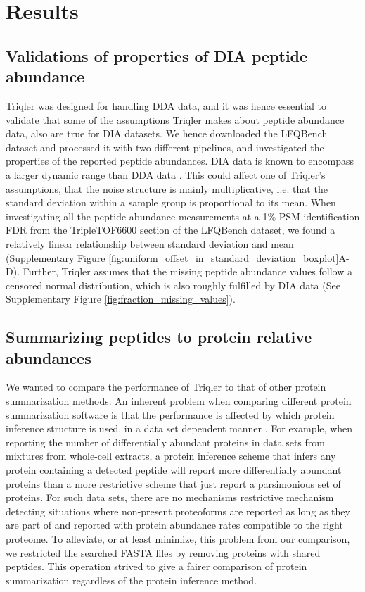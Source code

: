 \documentclass[10pt,letterpaper]{article}
\begin{document}
\section*{Results}


\subsection*{Validations of properties of DIA peptide abundance}

Triqler was designed for handling DDA data, and it was hence essential to validate that some of the assumptions Triqler makes about peptide abundance data, also are true for DIA datasets.
We hence downloaded the LFQBench dataset and processed it with two different pipelines, and investigated the properties of the reported peptide abundances. DIA data is known to encompass a larger dynamic range than DDA data . This could affect one of Triqler's assumptions, that the noise structure is mainly multiplicative, i.e. that the standard deviation within a sample group is proportional to its mean. When investigating all the peptide abundance measurements at a 1\% PSM identification FDR from the TripleTOF6600 section of the LFQBench dataset, we found a relatively linear relationship between standard deviation and mean (Supplementary Figure \ref{fig:uniform_offset_in_standard_deviation_boxplot}A-D). Further, Triqler assumes that the missing peptide abundance values follow a censored normal distribution, which is also roughly fulfilled by DIA data (See Supplementary Figure \ref{fig:fraction_missing_values}).

\subsection*{Summarizing peptides to protein relative abundances}

We wanted to compare the performance of Triqler to that of other protein summarization methods. An inherent problem when comparing different protein summarization software is that the performance is affected by which protein inference structure is used, in a data set dependent manner \cite{serang2012recognizing}. For example, when reporting the number of differentially abundant proteins in data sets from mixtures from whole-cell extracts, a protein inference scheme that infers any protein containing a detected peptide will report more differentially abundant proteins than a more restrictive scheme that just report a parsimonious set of proteins. For such data sets, there are no mechanisms restrictive mechanism detecting situations where non-present proteoforms are reported as long as they are part of and reported with protein abundance rates compatible to the right proteome. To alleviate, or at least minimize, this problem from our comparison, we restricted the searched FASTA files by removing proteins with shared peptides. This operation strived to give a fairer comparison of protein summarization regardless of the protein inference method.
\end{document}
